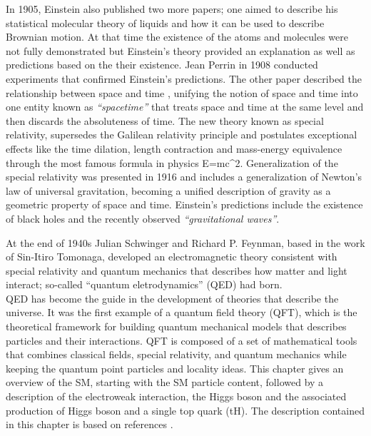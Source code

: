 \noindent In 1905, Einstein also published two more papers; one aimed to describe his statistical molecular theory of liquids and how it can be used to describe Brownian motion\cite{brownian}. At that time the existence of the atoms and molecules were not fully demonstrated but Einstein's theory provided an explanation as well as predictions based on the their existence. Jean Perrin in 1908 conducted experiments that confirmed Einstein's predictions. The other paper described the relationship between space and time \cite{relativity}, unifying the notion of space and time into one entity known as \textit{``spacetime''} that treats space and time at the same level and then discards the absoluteness of time. The new theory known as special relativity, supersedes the Galilean relativity principle and postulates exceptional effects like the time dilation, length contraction and mass-energy equivalence through the most famous formula in physics\cite{energy}
\beqn
E=mc^2.
\eeqn
\noindent Generalization of the special relativity was presented in 1916 and includes a generalization of Newton's law of universal gravitation, becoming a unified description of gravity as a geometric property of space and time. Einstein's predictions include the existence of black holes and the recently observed \textit{``gravitational waves''}\cite{ligo}.  

\noindent At the end of 1940s Julian Schwinger\cite{schwinger} and Richard P. Feynman\cite{feynman}, based in the work of Sin-Itiro Tomonaga\cite{tomonaga}, developed an electromagnetic theory consistent with special relativity and quantum mechanics that describes how matter and light interact; so-called ``quantum eletrodynamics'' (QED) had born.\\%

\noindent QED has become the guide in the development of theories that describe the universe. It was the first example of a quantum field theory (QFT), which is the theoretical framework for building quantum mechanical models that describes particles and their interactions. QFT is composed of a set of mathematical tools that combines classical fields, special relativity, and quantum mechanics while keeping the quantum point particles and locality ideas. This chapter gives an overview of the SM, starting with the SM particle content, followed by a description of the electroweak interaction, the Higgs boson and the associated production of Higgs boson and a single top quark (tH). The description contained in this chapter is based on references \cite{griffiths, mandl, halzen}.  %

